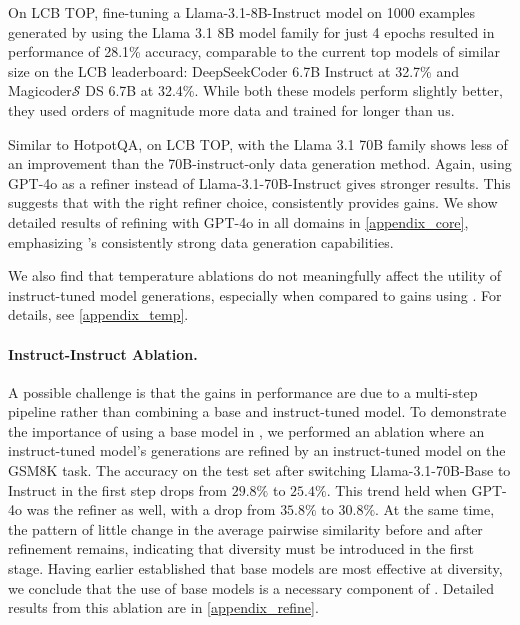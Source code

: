 On LCB TOP, fine-tuning a Llama-3.1-8B-Instruct model on 1000 examples generated by \Sys{} using the Llama 3.1 8B model family for just 4 epochs resulted in performance of 28.1\% accuracy, comparable to the current top models of similar size on the LCB leaderboard: DeepSeekCoder 6.7B Instruct \cite{guo2024deepseek} at 32.7\% and Magicoder$\mathcal{S}$ DS 6.7B \cite{wei2024magicoder} at 32.4\%. While both these models perform slightly better, they used orders of magnitude more data and trained for longer than us.

Similar to HotpotQA, on LCB TOP, \Sys{} with the Llama 3.1 70B family shows less of an improvement than the 70B-instruct-only data generation method. Again, using GPT-4o as a refiner instead of Llama-3.1-70B-Instruct gives stronger results. This suggests that with the right refiner choice, \Sys{} consistently provides gains. We show detailed results of refining with GPT-4o in all domains in \cref{appendix_core}, emphasizing \Sys{}'s consistently strong data generation capabilities.

We also find that temperature ablations do not meaningfully affect the utility of instruct-tuned model generations, especially when compared to gains using \Sys{}. For details, see \cref{appendix_temp}.

\paragraph{Instruct-Instruct Ablation.} A possible challenge is that the gains in performance are due to a multi-step pipeline rather than combining a base and instruct-tuned model. To demonstrate the importance of using a base model in \Sys{}, we performed an ablation where an instruct-tuned model's generations are refined by an instruct-tuned model on the GSM8K task. The accuracy on the test set after switching Llama-3.1-70B-Base to Instruct in the first step drops from $29.8\%$ to $25.4\%$. This trend held when GPT-4o was the refiner as well, with a drop from $35.8\%$ to $30.8\%$. At the same time, the pattern of little change in the average pairwise similarity before and after refinement remains, indicating that diversity must be introduced in the first stage. Having earlier established that base models are most effective at diversity, we conclude that the use of base models is a necessary component of \Sys{}. Detailed results from this ablation are in \cref{appendix_refine}.
